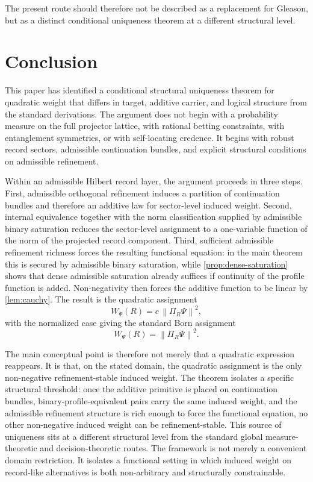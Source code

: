 \documentclass[11pt]{article}
\theoremstyle{remark}
\numberwithin{equation}{section}
\newcommand{\Wpsi}[1]{W_{\Psi}\!\left(#1\right)}
\newcommand{\Proj}[1]{\Pi_{#1}}
\newcommand{\norm}[1]{\left\lVert #1 \right\rVert}
\begin{document}
The present route should therefore not be described as a replacement for Gleason, but as a distinct conditional uniqueness theorem at a different structural level.


\section{Conclusion}
\label{sec:conclusion}

This paper has identified a conditional structural uniqueness theorem for quadratic weight that differs in target, additive carrier, and logical structure from the standard derivations. The argument does not begin with a probability measure on the full projector lattice, with rational betting constraints, with entanglement symmetries, or with self-locating credence. It begins with robust record sectors, admissible continuation bundles, and explicit structural conditions on admissible refinement.

Within an admissible Hilbert record layer, the argument proceeds in
three steps. First, admissible orthogonal refinement induces a
partition of continuation bundles and therefore an additive law for
sector-level induced weight. Second, internal equivalence together
with the norm classification supplied by admissible binary saturation
reduces the sector-level assignment to a one-variable function of the
norm of the projected record component. Third, sufficient admissible refinement
richness forces the resulting functional equation: in the main theorem
this is secured by admissible binary saturation, while
\cref{prop:dense-saturation} shows that dense admissible saturation
already suffices if continuity of the profile function is added.
Non-negativity then forces the additive function to be linear by
\cref{lem:cauchy}. The result is the quadratic assignment
\[
\Wpsi{R} = c\,\norm{\Proj{R}\Psi}^2,
\]
with the normalized case giving the standard Born assignment
\[
\Wpsi{R} = \norm{\Proj{R}\Psi}^2.
\]

The main conceptual point is therefore not merely that a quadratic
expression reappears. It is that, on the stated domain, the quadratic
assignment is the only non-negative refinement-stable induced weight.
The theorem isolates a specific structural threshold: once the
additive primitive is placed on continuation bundles, binary-profile-equivalent
pairs carry the same induced weight, and the admissible refinement
structure is rich enough to force the functional equation, no other
non-negative induced weight can be refinement-stable.
This source of uniqueness sits at a different structural level from the standard global measure-theoretic and decision-theoretic routes. The framework is not merely a convenient domain restriction. It isolates a functional setting in which induced weight on record-like alternatives is both non-arbitrary and structurally constrainable.
\end{document}
